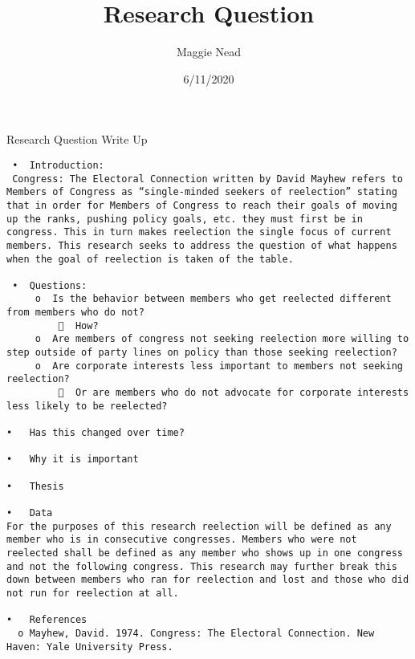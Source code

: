 \documentclass[]{article}
\title{Research Question}
\author{Maggie Nead}
\date{6/11/2020}
\begin{document}
\maketitle

Research Question Write Up

\begin{verbatim}
 •  Introduction: 
 Congress: The Electoral Connection written by David Mayhew refers to Members of Congress as “single-minded seekers of reelection” stating that in order for Members of Congress to reach their goals of moving up the ranks, pushing policy goals, etc. they must first be in congress. This in turn makes reelection the single focus of current members. This research seeks to address the question of what happens when the goal of reelection is taken of the table.

 •  Questions:
     o  Is the behavior between members who get reelected different from members who do not?
           How?
     o  Are members of congress not seeking reelection more willing to step outside of party lines on policy than those seeking reelection?
     o  Are corporate interests less important to members not seeking reelection?
           Or are members who do not advocate for corporate interests less likely to be reelected?

•   Has this changed over time?

•   Why it is important

•   Thesis

•   Data
For the purposes of this research reelection will be defined as any member who is in consecutive congresses. Members who were not reelected shall be defined as any member who shows up in one congress and not the following congress. This research may further break this down between members who ran for reelection and lost and those who did not run for reelection at all.

•   References
  o Mayhew, David. 1974. Congress: The Electoral Connection. New Haven: Yale University Press.
\end{verbatim}
\end{document}
